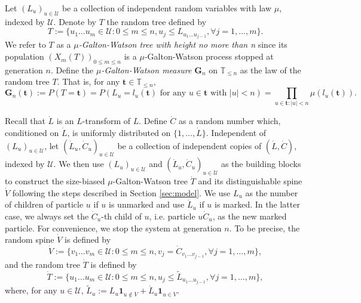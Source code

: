 \documentclass[12pt,a4paper]{amsart}
\numberwithin{equation}{section}
\begin{document}
	Let $(L_u)_{u\in\mathcal U}$ be a collection of independent random variables with law $\mu$, indexed by $\mathcal U$.
	Denote by $T$ the random tree defined by
\[
		T
	:=\{u_1\dots u_m\in \mathcal U: 0\le m\le n, u_j\leq L_{u_1\dots u_{j-1}},\forall j=1,\dots,m\}.
\]
	We refer to $T$ as a \emph{$\mu$-Galton-Watson tree with height no more than n} since its population $(X_m(T))_{0\le m\le n}$ is a $\mu$-Galton-Watson process stopped at generation $n$.
	Define the \emph{$\mu$-Galton-Watson measure $\mathbf G_n$} on $\mathbb T_{\leq n}$ as the law of the random tree $T$.
	That is, for any $ \mathbf t \in\mathbb T_{\leq n}$,
\[
		\mathbf G_n( \mathbf t )
    :=P(T= \mathbf t )
	=P(L_u=l_u( \mathbf t )\text{ for any } u\in \mathbf t  \text{ with }|u|<n)
	=\prod_{u\in  \mathbf t :|u|<n}\mu(l_u( \mathbf t )).
\]

	Recall that $\dot L$ is an $L$-transform of $L$.
	Define $\dot C$ as a random number which, conditioned on $\dot L$, is uniformly distributed on $\{1,\dots,\dot L\}$.
	Independent of $(L_u)_{u\in\mathcal U}$, let $(\dot L_u,\dot C_u)_{u\in \mathcal U}$ be a collection of independent copies of $(\dot L,\dot C)$, indexed by $\mathcal U$.
	We then use $(L_u)_{u\in\mathcal U}$ and $(\dot L_u,\dot C_u)_{u\in\mathcal U}$ as the building blocks to construct the size-biased $\mu$-Galton-Watson tree $\dot T$ and its distinguishable spine $\dot V$ following the steps described in Section \ref{sec:model}.
	We use $L_u$ as the number of children of particle $u$ if $u$ is unmarked and use $\dot L_u$ if $u$ is marked.
	In the latter case, we always set the
	$\dot C_u$-th child of $u$, i.e. particle $u \dot C_u$,
	as the new marked particle.
	For convenience, we stop the system at generation $n$. To be precise, the random spine $\dot V$ is defined by
\[
		\dot V
	:=\{v_1\dots v_m\in \mathcal U:0\le m\le n, v_j=\dot C_{v_1\dots v_{j-1}},\forall j=1,\dots,m\},
\]
	and the random tree $\dot T$ is defined by
\[
		\dot T
	:=\{u_1\dots u_m\in\mathcal U: 0\le m\le n,u_j\leq \tilde L_{u_1\dots u_{j-1}},\forall j=1,\dots,m\},
\]
	where, for any $u\in\mathcal U$, $\tilde L_u:=L_u\mathbf 1_{u\not\in \dot V}+\dot L_u\mathbf 1_{u\in \dot V}$.
\end{document}
